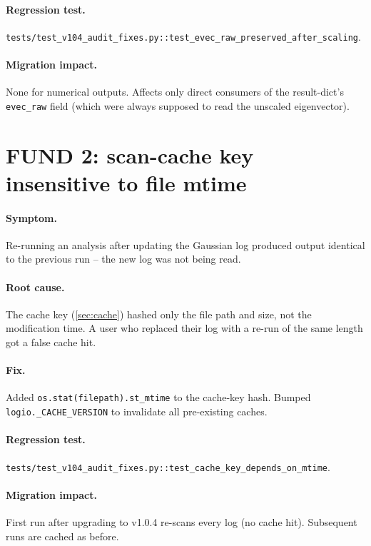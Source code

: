 \documentclass[10pt,a4paper,twoside]{article}
\newcommand{\fn}[1]{\texttt{#1}}
\begin{document}
\paragraph{Regression test.}
\fn{tests/test\_v104\_audit\_fixes.py::test\_evec\_raw\_preserved\_after\_scaling}.

\paragraph{Migration impact.}
None for numerical outputs. Affects only direct consumers of the
result-dict's \texttt{evec\_raw} field (which were always supposed
to read the unscaled eigenvector).

\section{FUND 2: scan-cache key insensitive to file mtime}
\label{sec:fund-2}

\paragraph{Symptom.}
Re-running an analysis after updating the Gaussian log produced
output identical to the previous run -- the new log was not being
read.

\paragraph{Root cause.}
The cache key (\cref{sec:cache}) hashed only the file path and
size, not the modification time. A user who replaced their log
with a re-run of the same length got a false cache hit.

\paragraph{Fix.}
Added \texttt{os.stat(filepath).st\_mtime} to the cache-key hash.
Bumped \fn{logio.\_CACHE\_VERSION} to invalidate all pre-existing
caches.

\paragraph{Regression test.}
\fn{tests/test\_v104\_audit\_fixes.py::test\_cache\_key\_depends\_on\_mtime}.

\paragraph{Migration impact.}
First run after upgrading to v1.0.4 re-scans every log (no cache
hit). Subsequent runs are cached as before.
\end{document}
